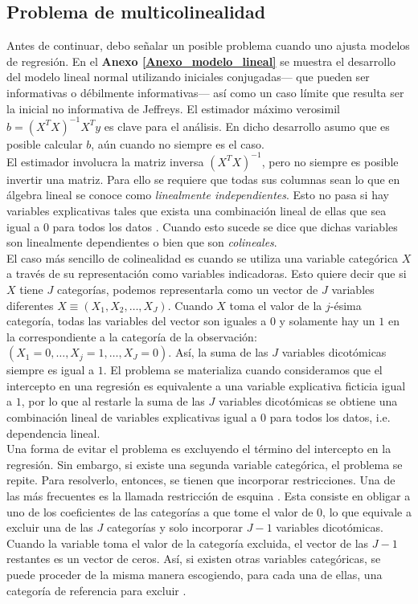 \subsection{Problema de multicolinealidad} \label{prob_multicolinealidad}

Antes de continuar, debo señalar un posible problema cuando uno ajusta modelos de regresión. En el \textbf{Anexo \ref{Anexo_modelo_lineal}} se muestra el desarrollo del modelo lineal normal utilizando iniciales conjugadas--- que pueden ser informativas o débilmente informativas--- así como un caso límite que resulta ser la inicial no informativa de Jeffreys. El estimador máximo verosimil $b=(X^TX)^{-1}X^Ty$ es clave para el análisis. En dicho desarrollo asumo que es posible calcular $b$, aún cuando no siempre es el caso.\\

El estimador involucra la matriz inversa $(X^TX)^{-1}$, pero no siempre es posible invertir una matriz. Para ello se requiere que todas sus columnas sean lo que en álgebra lineal se conoce como \textit{linealmente independientes}. Esto no pasa si hay variables explicativas tales que exista una combinación lineal de ellas que sea igual a $0$ para todos los datos \parencite{GelmanHill06}. Cuando esto sucede se dice que dichas variables son linealmente dependientes o bien que son \textit{colineales}.\\

El caso más sencillo de colinealidad es cuando se utiliza una variable categórica $X$ a través de su representación como variables indicadoras. Esto quiere decir que si $X$ tiene $J$ categorías, podemos representarla como un vector de $J$ variables diferentes $X \equiv (X_1,X_2,\dots,X_J)$. Cuando $X$ toma el valor de la $j$-ésima categoría, todas las variables del vector son iguales a $0$ y solamente hay un $1$ en la correspondiente a la categoría de la observación: $(X_1 = 0,\dots,X_j = 1,\dots,X_J=0)$. Así, la suma de las $J$ variables dicotómicas siempre es igual a $1$. El problema se materializa cuando consideramos que el intercepto en una regresión es equivalente a una variable explicativa ficticia igual a $1$, por lo que al restarle la suma de las $J$ variables dicotómicas se obtiene una combinación lineal de variables explicativas igual a $0$ para todos los datos, i.e. dependencia lineal.\\ 

Una forma de evitar el problema es excluyendo el término del intercepto en la regresión. Sin embargo, si existe una segunda variable categórica, el problema se repite. Para resolverlo, entonces, se tienen que incorporar restricciones. Una de las más frecuentes es la llamada restricción de esquina \parencite{Regueiro12}. Esta consiste en obligar a uno de los coeficientes de las categorías a que tome el valor de $0$, lo que equivale a excluir una de las $J$ categorías y solo incorporar $J-1$ variables dicotómicas. Cuando la variable toma el valor de la categoría excluida, el vector de las $J-1$ restantes es un vector de ceros. Así, si existen otras variables categóricas, se puede proceder de la misma manera escogiendo, para cada una de ellas, una categoría de referencia para excluir \parencite{GelmanHill06}.\\ 

